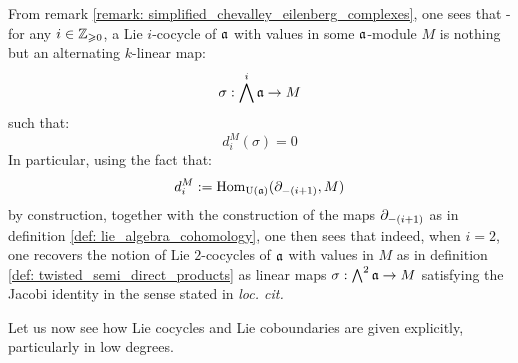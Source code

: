         \begin{remark}
            From remark \ref{remark: simplified_chevalley_eilenberg_complexes}, one sees that - for any $i \in \mathbb{Z}_{\geqslant 0}$, a Lie $i$-cocycle of $\mathfrak{a}$ with values in some $\mathfrak{a}$-module $M$ is nothing but an alternating $k$-linear map:
                $$\sigma: \bigwedge^i \mathfrak{a} \to M$$
            such that:
                $$d_i^M(\sigma) = 0$$
            In particular, using the fact that:
                $$d_i^M := \mathrm{Hom}_{\mathrm{U}(\mathfrak{a})}(\partial_{-(i + 1)}, M)$$
            by construction, together with the construction of the maps $\partial_{-(i + 1)}$ as in definition \ref{def: lie_algebra_cohomology}, one then sees that indeed, when $i = 2$, one recovers the notion of Lie $2$-cocycles of $\mathfrak{a}$ with values in $M$ as in definition \ref{def: twisted_semi_direct_products} as linear maps $\sigma: \bigwedge^2 \mathfrak{a} \to M$ satisfying the Jacobi identity in the sense stated in \textit{loc. cit.}
        \end{remark}

        Let us now see how Lie cocycles and Lie coboundaries are given explicitly, particularly in low degrees. 

